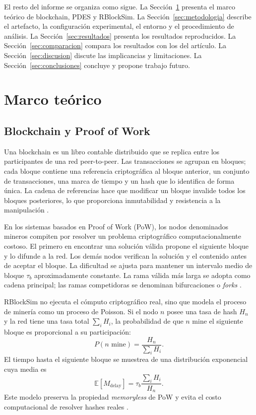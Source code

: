 \documentclass[11pt,a4paper,oneside]{article}
\begin{document}
El resto del informe se organiza como sigue. La Sección~\ref{sec:marco} presenta el marco teórico de blockchain, PDES y RBlockSim. La Sección~\ref{sec:metodologia} describe el artefacto, la configuración experimental, el entorno y el procedimiento de análisis. La Sección~\ref{sec:resultados} presenta los resultados reproducidos. La Sección~\ref{sec:comparacion} compara los resultados con los del artículo. La Sección~\ref{sec:discusion} discute las implicancias y limitaciones. La Sección~\ref{sec:conclusiones} concluye y propone trabajo futuro.

\section{Marco teórico}
\label{sec:marco}

\subsection{Blockchain y Proof of Work}

Una blockchain es un libro contable distribuido que se replica entre los participantes de una red peer-to-peer. Las transacciones se agrupan en bloques; cada bloque contiene una referencia criptográfica al bloque anterior, un conjunto de transacciones, una marca de tiempo y un hash que lo identifica de forma única. La cadena de referencias hace que modificar un bloque invalide todos los bloques posteriores, lo que proporciona inmutabilidad y resistencia a la manipulación \cite{nakamoto2008bitcoin}.

En los sistemas basados en Proof of Work (PoW), los nodos denominados mineros compiten por resolver un problema criptográfico computacionalmente costoso. El primero en encontrar una solución válida propone el siguiente bloque y lo difunde a la red. Los demás nodos verifican la solución y el contenido antes de aceptar el bloque. La dificultad se ajusta para mantener un intervalo medio de bloque $\tau_b$ aproximadamente constante. La rama válida más larga se adopta como cadena principal; las ramas competidoras se denominan bifurcaciones o \emph{forks} \cite{gervais2016security}.

RBlockSim no ejecuta el cómputo criptográfico real, sino que modela el proceso de minería como un proceso de Poisson. Si el nodo $n$ posee una tasa de hash $H_n$ y la red tiene una tasa total $\sum_i H_i$, la probabilidad de que $n$ mine el siguiente bloque es proporcional a su participación:
\begin{equation}
  P(n \text{ mine}) = \frac{H_n}{\sum_i H_i}.
  \label{eq:prob}
\end{equation}
El tiempo hasta el siguiente bloque se muestrea de una distribución exponencial cuya media es
\begin{equation}
  \mathbb{E}[M_{\text{delay}}] = \tau_b \frac{\sum_i H_i}{H_n}.
  \label{eq:delay}
\end{equation}
Este modelo preserva la propiedad \emph{memoryless} de PoW y evita el costo computacional de resolver hashes reales \cite{pimpini2025rblocksim}.
\end{document}
